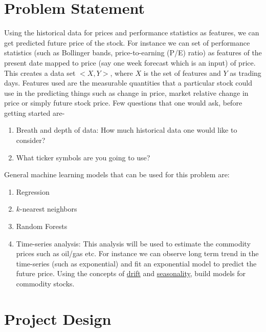 \documentclass[12pt]{article}
\begin{document}
\section{Problem Statement}
\label{sec:prob}
Using the historical data for prices and performance statistics as features, we can get predicted future price of the stock. For instance we can set of performance statistics (such as Bollinger bands,  price-to-earning (P/E) ratio) as features of the present date mapped to price (say one week forecast which is an input) of price.
This creates a data set $<X,Y>$, where $X$ is the set of features and $Y$ as trading days.  Features used are the measurable quantities that a particular stock could use in the predicting things such as change in price, market relative change in price or simply future stock price. Few questions that one would ask, before getting started are-
\begin{enumerate}
\item Breath and depth of data: How much historical data one would like to consider?
\item What ticker symbols are you going to use?
\end{enumerate}
General machine learning models that can be used for this problem are:
\begin{enumerate}
\item Regression
\item $k$-nearest neighbors
\item Random Forests
\item Time-series analysis: This analysis will be used to estimate the commodity prices such as oil/gas etc. For instance we can observe long term trend in the time-series (such as exponential) and fit an exponential model to predict the future price. Using the concepts of \underline{drift} and \underline{seasonality}, build models for commodity stocks.
\end{enumerate}

\section{Project Design}
\label{sec:design}
\end{document}
